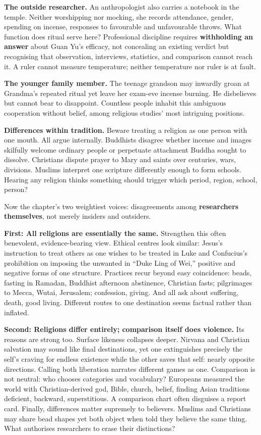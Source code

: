 \textbf{The outside researcher.} An anthropologist also carries a notebook in the temple. Neither worshipping nor mocking, she records attendance, gender, spending on incense, responses to favourable and unfavourable throws. What function does ritual serve here? Professional discipline requires \textbf{withholding an answer} about Guan Yu's efficacy, not concealing an existing verdict but recognising that observation, interviews, statistics, and comparison cannot reach it. A ruler cannot measure temperature; neither temperature nor ruler is at fault.

\textbf{The younger family member.} The teenage grandson may inwardly groan at Grandma's repeated ritual yet leave her exam-eve incense burning. He disbelieves but cannot bear to disappoint. Countless people inhabit this ambiguous cooperation without belief, among religious studies' most intriguing positions.

\textbf{Differences within tradition.} Beware treating a religion as one person with one mouth. All argue internally. Buddhists disagree whether incense and images skilfully welcome ordinary people or perpetuate attachment Buddha sought to dissolve. Christians dispute prayer to Mary and saints over centuries, wars, divisions. Muslims interpret one scripture differently enough to form schools. Hearing any religion thinks something should trigger which period, region, school, person?

Now the chapter's two weightiest voices: disagreements among \textbf{researchers themselves}, not merely insiders and outsiders.

\textbf{First: All religions are essentially the same.} Strengthen this often benevolent, evidence-bearing view. Ethical centres look similar: Jesus's instruction to treat others as one wishes to be treated in Luke and Confucius's prohibition on imposing the unwanted in ``Duke Ling of Wei,'' positive and negative forms of one structure. Practices recur beyond easy coincidence: beads, fasting in Ramadan, Buddhist afternoon abstinence, Christian fasts; pilgrimages to Mecca, Wutai, Jerusalem; confession, giving. And all ask about suffering, death, good living. Different routes to one destination seems factual rather than inflated.

\textbf{Second: Religions differ entirely; comparison itself does violence.} Its reasons are strong too. Surface likeness collapses deeper. Nirvana and Christian salvation may sound like final destinations, yet one extinguishes precisely the self's craving for endless existence while the other saves that self: nearly opposite directions. Calling both liberation narrates different games as one. Comparison is not neutral: who chooses categories and vocabulary? Europeans measured the world with Christian-derived god, Bible, church, belief, finding Asian traditions deficient, backward, superstitious. A comparison chart often disguises a report card. Finally, differences matter supremely to believers. Muslims and Christians may share bead shapes yet both object when told they believe the same thing. What authorises researchers to erase their distinctions?

